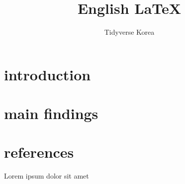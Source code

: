 \documentclass{article}
\begin{document}
	\title{English \LaTeX}
	\author{Tidyverse Korea}
	\maketitle
	
	\abstract{}
		{\selectfont
			\lipsum[1]	
		}
	\section{introduction}
			\lipsum[3]
	\section{main findings}
		\lipsum[1-2]
	\section{references}
		Lorem \autocite{sigfridsson}
		ipsum \autocite{worman}
		dolor \autocite{nussbaum}
		sit \autocite{sigfridsson}
		amet \autocite{geer}	
	\printbibliography
\end{document}
